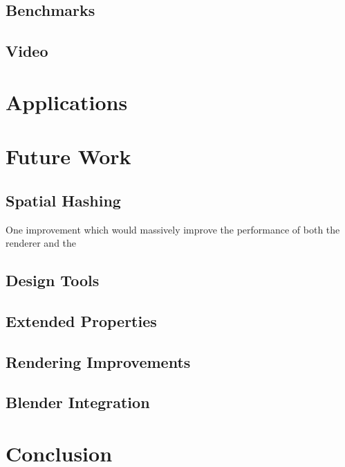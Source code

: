 \documentclass{acmsiggraph}
\begin{document}
\subsection{Benchmarks}

\subsection{Video}

\section{Applications}

\section{Future Work}

\subsection{Spatial Hashing}

One improvement which would massively improve the performance of both the renderer and the

\subsection{Design Tools}

\subsection{Extended Properties}

\subsection{Rendering Improvements}

\subsection{Blender Integration}

\section{Conclusion}


\nocite{*}

\end{document}
